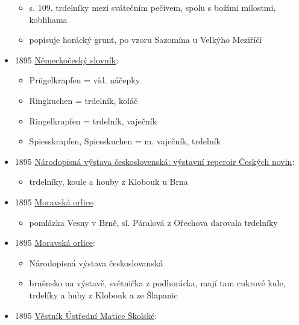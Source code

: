 \begin{itemize}
  \begin{itemize}
  \tightlist
  \item
    s. 109. trdelníky mezi svátečním pečivem, spolu s božími milostmi,
    koblihama
  \item
    popisuje horácký grunt, po vzoru Sazomína u Velkýho Meziříčí
  \end{itemize}
\item
  1895
  \href{https://ceskadigitalniknihovna.cz/uuid/uuid:a7ab5cf0-1dae-11e7-a38c-005056827e51}{Německočeský
  slovník}:

  \begin{itemize}
  \tightlist
  \item
    Prügelkrapfen = víd. náčepky
  \item
    Ringkuchen = trdelník, koláč
  \item
    Ringelkrapfen = trdelník, vaječník
  \item
    Spiesskrapfen, Spiesskuchen = m. vaječník, trdelník
  \end{itemize}
\item
  1895
  \href{https://ceskadigitalniknihovna.cz/uuid/uuid:67436920-adcf-11ed-9763-5ef3fc9bb22f}{Národopisná
  výstava československá: výstavní reperoir Českých novin}:

  \begin{itemize}
  \tightlist
  \item
    trdelníky, koule a houby z Klobouk u Brna
  \end{itemize}
\item
  1895
  \href{https://ceskadigitalniknihovna.cz/view/uuid:0519cc62-32f0-11de-992b-00145e5790ea?page=uuid:2a76016a-32f0-11de-992b-00145e5790ea&fulltext=trdel*&source=mzk}{Moravská
  orlice}:

  \begin{itemize}
  \tightlist
  \item
    pomlázka Vesny v Brně, sl. Páralová z Ořechova darovala trdelníky
  \end{itemize}
\item
  1895
  \href{https://ceskadigitalniknihovna.cz/view/uuid:051a1a8d-32f0-11de-992b-00145e5790ea?page=uuid:2a7c1c1f-32f0-11de-992b-00145e5790ea&fulltext=trdeln\%C3\%AD*&source=mzk}{Moravská
  orlice}:

  \begin{itemize}
  \tightlist
  \item
    Národopisná výstava českoslovanská
  \item
    brněnsko na výstavě, světnička z podhorácka, mají tam cukrové kule,
    trdelíky a huby z Klobouk a ze Šlapanic
  \end{itemize}
\item
  1895
  \href{https://ceskadigitalniknihovna.cz/uuid/uuid:f6731d10-a2e1-11e7-a093-005056825209}{Věstník
  Ústřední Matice Školské}:


\end{itemize}

